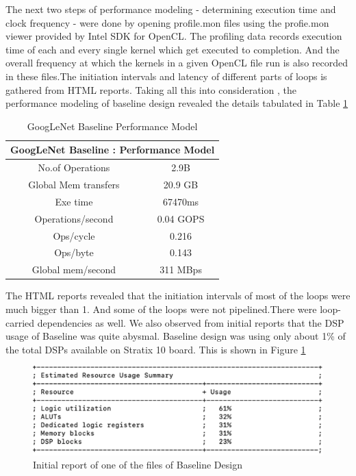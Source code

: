 The next two steps of performance modeling - determining execution time and clock frequency - were done by opening profile.mon files using the profie.mon viewer provided by Intel SDK for OpenCL. The profiling data records execution time of each and every single kernel which get executed to completion. And the overall frequency at which the kernels in a given OpenCL file run is also recorded in these files.The initiation intervals and latency of different parts of loops is gathered from HTML reports. Taking all this into consideration , the performance modeling of baseline design revealed the details tabulated in Table \ref{tab:GoogLeNetBaselinePerfModel} 
\begin{table}[!htb]                          
 \centering
    \begin{tabular}{|c|c|}
    \multicolumn{2}{c}{\textbf{GoogLeNet Baseline : Performance Model}} \\ \hline

     No.of Operations    &   2.9B \\ \hline
      Global Mem transfers &   20.9 GB            \\ \hline          
      Exe time    &  67470ms    \\ \hline
      Operations/second   &   0.04 GOPS \\ \hline
      Ops/cycle &   0.216             \\ \hline
      Ops/byte       &   0.143     \\ \hline
      Global mem/second & 311 MBps  \\ \hline

    \end{tabular}
    \caption{GoogLeNet Baseline Performance Model}
    \label{tab:GoogLeNetBaselinePerfModel}                            

\end{table}  


The HTML reports revealed that the initiation intervals of most of the loops were much bigger than 1. And some of the loops were not pipelined.There were loop-carried dependencies as well. We also observed from initial reports that the DSP usage of Baseline was quite abysmal. Baseline design was using only about 1\% of the total DSPs available on Stratix 10 board. This is shown in Figure \ref{fig:Report_Baseline}   


\begin{figure}[!htb]
  \includegraphics[width=\textwidth,height=\textheight,keepaspectratio]{img/Report_Baseline.png}
  \caption{Initial report of one of the files of Baseline Design}
  \label{fig:Report_Baseline}
\end{figure}

